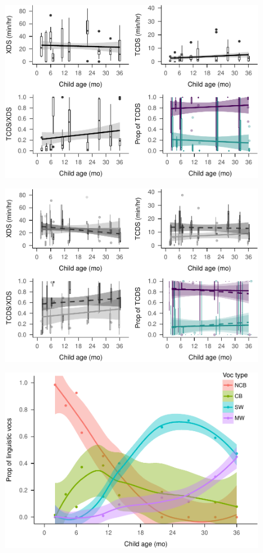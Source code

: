 \documentclass[man]{apa6}
\theoremstyle{definition}
\theoremstyle{definition}
\theoremstyle{definition}
\theoremstyle{remark}
\begin{document}
\begin{figure}
\centering
\includegraphics{Tseltal-CLE_files/figure-latex/plot_XDS_TDS_quantity_random-1.pdf}
\caption{}
\end{figure}

\begin{figure}
\centering
\includegraphics{Tseltal-CLE_files/figure-latex/plot_XDS_TDS_quantity_nonrandom-1.pdf}
\caption{}
\end{figure}

\begin{figure}
\centering
\includegraphics{Tseltal-CLE_files/figure-latex/plot_chi_voctypes_overall-1.pdf}
\caption{}
\end{figure}
\end{document}
